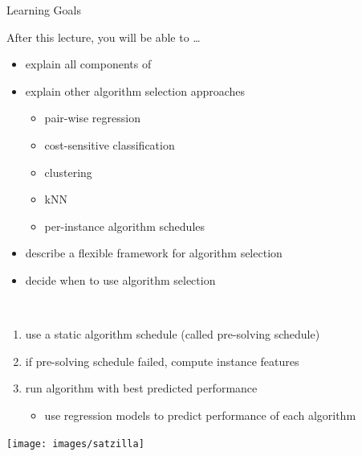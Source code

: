 \begin{frame}[c]{Learning Goals}

After this lecture, you will be able to \ldots

\begin{itemize}
  \item explain all components of \alert{\satzilla}
  \item explain other algorithm selection approaches
  \begin{itemize}
	  \item \alert{pair-wise regression} 
	  \item \alert{cost-sensitive classification} 
	  \item \alert{clustering} 
	  \item \alert{kNN}
	  \item \alert{per-instance algorithm schedules}
  \end{itemize}
  \item describe a \alert{flexible framework} for algorithm selection
  \item decide \alert{when} to use algorithm selection
\end{itemize}
\end{frame}
\begin{frame}[c]{\satzilla{}~}

\begin{enumerate}
	\item use a static algorithm schedule (called pre-solving schedule)
	\item if pre-solving schedule failed, compute instance features 
	\item run algorithm with best predicted performance
	  \begin{itemize}
	    \item use regression models to predict performance of each algorithm\\
	  \end{itemize}
\end{enumerate}

\centering
\texttt{[image: images/satzilla]}

\end{frame}
